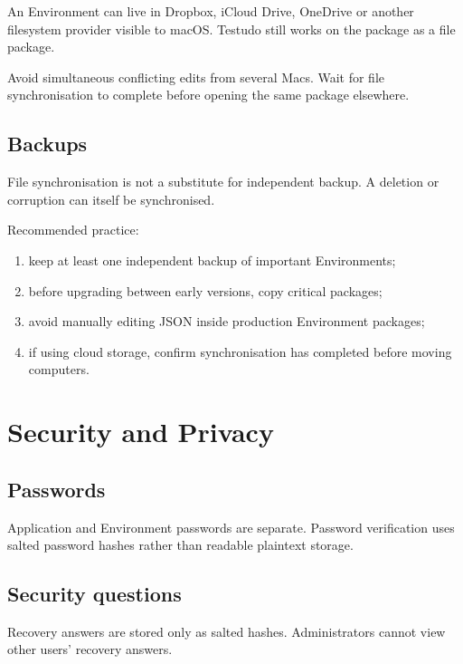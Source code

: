 \documentclass{testudomanual}
\begin{document}
An Environment can live in Dropbox, iCloud Drive, OneDrive or another filesystem provider visible to macOS. Testudo still works on the package as a file package.

Avoid simultaneous conflicting edits from several Macs. Wait for file synchronisation to complete before opening the same package elsewhere.

\section{Backups}

File synchronisation is not a substitute for independent backup. A deletion or corruption can itself be synchronised.

Recommended practice:
\begin{enumerate}
    \item keep at least one independent backup of important Environments;
    \item before upgrading between early versions, copy critical  packages;
    \item avoid manually editing JSON inside production Environment packages;
    \item if using cloud storage, confirm synchronisation has completed before moving computers.
\end{enumerate}

\chapter{Security and Privacy}

\section{Passwords}

Application and Environment passwords are separate. Password verification uses salted password hashes rather than readable plaintext storage.

\section{Security questions}

Recovery answers are stored only as salted hashes. Administrators cannot view other users' recovery answers.
\end{document}
